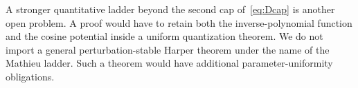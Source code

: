A stronger quantitative ladder beyond the second cap of~\eqref{eq:Dcap} is another open problem. A proof would have to retain both the inverse-polynomial function and the cosine potential inside a uniform quantization theorem. We do not import a general perturbation-stable Harper theorem under the name of the Mathieu ladder. Such a theorem would have additional parameter-uniformity obligations.

\label{end:conjectures}
